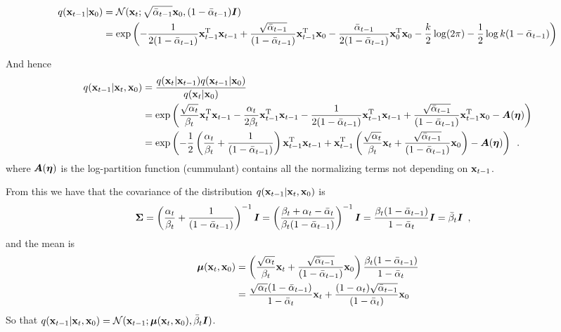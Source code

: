 \begin{align*}
    q({\mathbf{x}}_{t-1} | {\mathbf{x}}_0) &= \mathcal{N}({\mathbf{x}}_t; \sqrt{\bar{\alpha}_{t-1}} {\mathbf{x}}_0, (1 - \bar{\alpha}_{t-1}) {\bm{I}}) \\
    &= \exp \left(-\frac{1}{2(1 - \bar{\alpha}_{t-1})} {\mathbf{x}}_{t-1}^{\mathrm{T}} {\mathbf{x}}_{t-1} + \frac{\sqrt{\bar{\alpha}_{t-1}}}{(1 - \bar{\alpha}_{t-1})} {\mathbf{x}}_{t-1}^{\mathrm{T}} {\mathbf{x}}_{0} - \frac{\bar{\alpha}_{t-1}}{2(1 - \bar{\alpha}_{t-1})}{\mathbf{x}}_{0}^{\mathrm{T}} {\mathbf{x}}_{0} - \frac{k}{2} \log (2 \pi) - \frac{1}{2} \log k (1 - \bar{\alpha}_{t-1}) \right) 
\end{align*}

And hence
\begin{align*}
    q({\mathbf{x}}_{t-1} | {\mathbf{x}}_t, {\mathbf{x}}_0) &= \frac{q({\mathbf{x}}_t | {\mathbf{x}}_{t-1}) q({\mathbf{x}}_{t-1} | {\mathbf{x}}_0) }{q({\mathbf{x}}_t | {\mathbf{x}}_0) } \\
    &= \exp \left(
        \frac{\sqrt{\alpha_t}}{\beta_t} {\mathbf{x}}_t^{\mathrm{T}} {\mathbf{x}}_{t-1} - \frac{\alpha_t}{2\beta_t}{\mathbf{x}}_{t-1}^{\mathrm{T}} {\mathbf{x}}_{t-1}-\frac{1}{2(1 - \bar{\alpha}_{t-1})} {\mathbf{x}}_{t-1}^{\mathrm{T}} {\mathbf{x}}_{t-1} + \frac{\sqrt{\bar{\alpha}_{t-1}}}{(1 - \bar{\alpha}_{t-1})} {\mathbf{x}}_{t-1}^{\mathrm{T}} {\mathbf{x}}_{0}
        - {\bm{A}}(\bm{\eta}) \right) \\
        &= \exp \left( -\frac{1}{2}\left( \frac{\alpha_t}{\beta_t} + \frac{1}{(1 - \bar{\alpha}_{t-1})} \right){\mathbf{x}}_{t-1}^{\mathrm{T}} {\mathbf{x}}_{t-1}
        + {\mathbf{x}}_{t-1}^{\mathrm{T}} \left( \frac{\sqrt{\alpha_t}}{\beta_t}{\mathbf{x}}_t + \frac{\sqrt{\bar{\alpha}_{t-1}}}{(1 - \bar{\alpha}_{t-1})} {\mathbf{x}}_0 \right)
        - {\bm{A}}(\bm{\eta}) 
        \right)  \enspace .
\end{align*}
where ${\bm{A}}(\bm{\eta})$ is the log-partition function (cummulant) contains all the normalizing terms not depending on ${\mathbf{x}}_{t-1}$.

From this we have that the covariance of the distribution $q({\mathbf{x}}_{t-1} | {\mathbf{x}}_t, {\mathbf{x}}_0)$ is 
\begin{align*}
    {\bm{\Sigma}} &= \left(\frac{\alpha_t}{\beta_t} + \frac{1}{(1 - \bar{\alpha}_{t-1})} \right)^{-1} {\bm{I}}
    = \left(\frac{\beta_t + \alpha_t - \bar{\alpha}_t}{\beta_t(1 - \bar{\alpha}_{t-1})} \right)^{-1} {\bm{I}}
    = \frac{\beta_t(1 - \bar{\alpha}_{t-1})}{1 - \bar{\alpha}_t} {\bm{I}} = \bar{\beta}_t {\bm{I}}
    \enspace ,
\end{align*}
and the mean is
\begin{align*}
    {\bm{\mu}}({\mathbf{x}}_t, {\mathbf{x}}_0) &= \left( \frac{\sqrt{\alpha_t}}{\beta_t}{\mathbf{x}}_t + \frac{\sqrt{\bar{\alpha}_{t-1}}}{(1 - \bar{\alpha}_{t-1})} {\mathbf{x}}_0 \right) \frac{\beta_t(1 - \bar{\alpha}_{t-1})}{1 - \bar{\alpha}_t} \\
    &= \frac{\sqrt{\alpha_t}(1 - \bar{\alpha}_{t-1})}{1 - \bar{\alpha}_t}{\mathbf{x}}_t
    + \frac{(1-\alpha_t)\sqrt{\bar{\alpha}_{t-1}}}{(1 - \bar{\alpha}_t)} {\mathbf{x}}_0
\end{align*}
So that $q({\mathbf{x}}_{t-1} | {\mathbf{x}}_t, {\mathbf{x}}_0) = \mathcal{N}({\mathbf{x}}_{t-1}; {\bm{\mu}}({\mathbf{x}}_t, {\mathbf{x}}_0), \bar{\beta}_t {\bm{I}})$.

